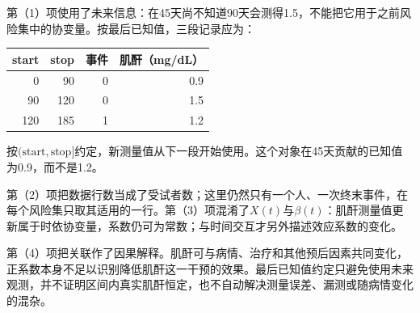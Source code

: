\par\noindent\begin{minipage}{\linewidth}
第（1）项使用了未来信息：在45天尚不知道90天会测得1.5，不能把它用于之前风险集中的协变量。按最后已知值，三段记录应为：
\begin{center}\begin{tabular}{rrrr}\toprule
start & stop & 事件 & 肌酐（mg/dL）\\\midrule
0 & 90 & 0 & 0.9\\
90 & 120 & 0 & 1.5\\
120 & 185 & 1 & 1.2\\\bottomrule
\end{tabular}\end{center}
按$(\mathrm{start},\mathrm{stop}]$约定，新测量值从下一段开始使用。这个对象在45天贡献的已知值为0.9，而不是1.2。

第（2）项把数据行数当成了受试者数；这里仍然只有一个人、一次终末事件，在每个风险集只取其适用的一行。第（3）项混淆了$X(t)$与$\beta(t)$：肌酐测量值更新属于时依协变量，系数仍可为常数；与时间交互才另外描述效应系数的变化。

第（4）项把关联作了因果解释。肌酐可与病情、治疗和其他预后因素共同变化，正系数本身不足以识别降低肌酐这一干预的效果。最后已知值约定只避免使用未来观测，并不证明区间内真实肌酐恒定，也不自动解决测量误差、漏测或随病情变化的混杂。
\par\nobreak\smallskip{}
\end{minipage}\par\medskip
